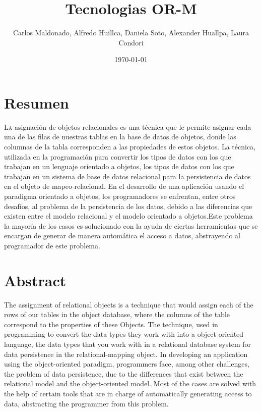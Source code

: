\documentclass[twoside,twocolumn]{article}
\title{Tecnologias OR-M} %
\author{Carlos Maldonado, Alfredo Huillca, Daniela Soto, Alexander Huallpa, Laura Condori}
\date{\today} %
\begin{document}
\maketitle


\section{Resumen}

\lettrine[nindent=0em,lines=3]{L}a asignación de objetos relacionales es una técnica que le permite asignar cada una de las filas de nuestras
tablas en la base de datos de objetos, donde las columnas de la tabla corresponden a las propiedades de estos
objetos. La técnica, utilizada en la programación para convertir los tipos de datos con los que trabajan en un
lenguaje orientado a objetos, los tipos de datos con los que trabajan en un sistema de base de datos relacional
para la persistencia de datos en el objeto de mapeo-relacional. En el desarrollo de  una  aplicación  usando  el  paradigma  orientado  a  objetos,  los programadores  se enfrentan, entre otros desafíos, al problema de la persistencia de los datos, debido a las diferencias que existen  entre  el  modelo  relacional  y  el  modelo  orientado  a  objetos.Este  problema  la  mayoría  de  los casos  es  solucionado  con  la  ayuda  de  ciertas  herramientas  que  se  encargan  de  generar  de  manera automática el acceso a datos, abstrayendo al programador de este problema.




\section{Abstract}


The assignment of relational objects is a technique that would assign each of the rows of our
tables in the object database, where the columns of the table correspond to the properties of these
Objects. The technique, used in programming to convert the data types they work with into a
object-oriented language, the data types that you work with in a relational database system
for data persistence in the relational-mapping object. In developing an application using the object-oriented paradigm, programmers face, among other challenges, the problem of data persistence, due to the differences that exist between the relational model and the object-oriented model. Most of the cases are solved with the help of certain tools that are in charge of automatically generating access to data, abstracting the programmer from this problem.
\end{document}
